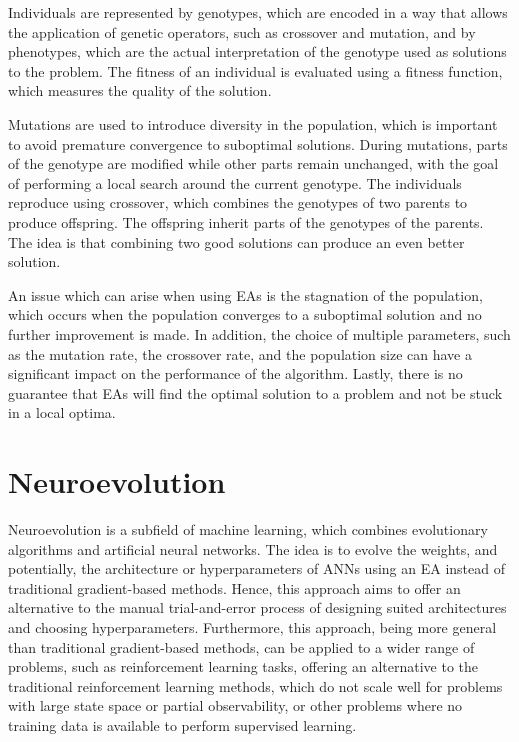 Individuals are represented by genotypes, which are encoded in a way that allows the application of genetic operators, such as crossover and mutation, and
by phenotypes, which are the actual interpretation of the genotype used as solutions to the problem. The fitness of an individual is evaluated using a
fitness function, which measures the quality of the solution.

Mutations are used to introduce diversity in the population, which is important to avoid premature convergence to suboptimal solutions. During mutations,
parts of the genotype are modified while other parts remain unchanged, with the goal of performing a local search around the current genotype.
The individuals reproduce using crossover, which combines the genotypes of two parents to produce offspring. The offspring inherit parts of the genotypes
of the parents. The idea is that combining two good solutions can produce an even better solution.


An issue which can arise when using EAs is the stagnation of the population, which occurs when the population converges to a suboptimal solution and
no further improvement is made. In addition, the choice of multiple parameters, such as the mutation rate, the crossover rate, and the population size
can have a significant impact on the performance of the algorithm. Lastly, there is no guarantee that EAs will find the optimal solution to a problem and
not be stuck in a local optima.

\section{Neuroevolution}

Neuroevolution is a subfield of machine learning, which combines evolutionary algorithms and artificial neural networks. The idea is to evolve the weights,
and potentially, the architecture or hyperparameters of ANNs using an EA instead of traditional gradient-based methods. Hence, this approach aims to
offer an alternative to the manual trial-and-error process of designing suited architectures and choosing hyperparameters. Furthermore, this approach,
being more general than traditional gradient-based methods, can be applied to a wider range of problems, such as reinforcement learning tasks, offering an
alternative to the traditional reinforcement learning methods, which do not scale well for problems with large state space or partial observability,
or other problems where no training data is available to perform supervised learning.

